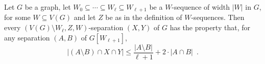 \documentclass{patmorin}
\begin{document}





\begin{lem}\label{z_corollary}
  Let $G$ be a graph, let $W_0\subseteq\cdots\subseteq W_\ell\subseteq W_{\ell+1}$ be a $W$-sequence of width $|W|$ in $G$, for some $W\subseteq V(G)$ and let $Z$ be as in the definition of $W$-sequences.
  Then every $(V(G)\setminus W_{\ell},Z,W)$-separation $(X,Y)$ of $G$ has the property that, for any separation
  $(A,B)$ of $G[W_{\ell+1}]$,
  \[
    |(A\setminus B)\cap X\cap Y|\le \frac{|A\setminus B|}{\ell+1}+ 2\cdot|A\cap B|  \enspace .
  \]
\end{lem}
\end{document}
